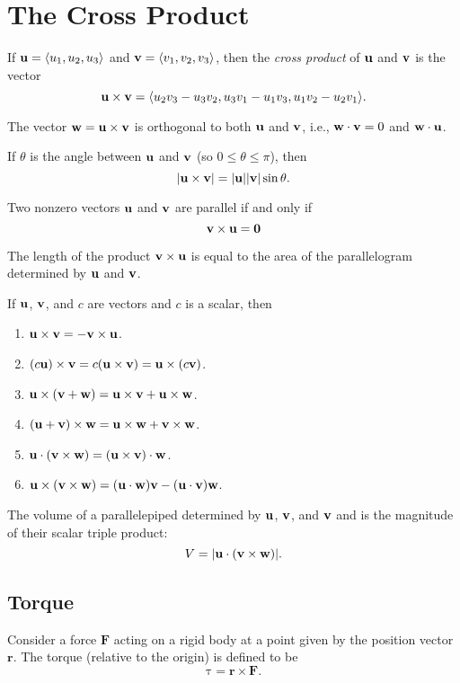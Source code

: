 \section{The Cross Product}
\begin{definition}
If $\mathbf{u}=\langle u_1,u_2,u_3\rangle$ and $\mathbf{v}=\langle v_1,v_2,v_3\rangle$,
then the \emph{cross product} of $\mathbf{u}$ and $\mathbf{v}$ is the vector
\[
\mathbf{u}\times\mathbf{v}=\langle u_2v_3-u_3v_2,u_3v_1-u_1v_3,u_1v_2-u_2v_1\rangle.
\]
\end{definition}
\begin{theorem}
The vector $\mathbf{w}=\mathbf{u}\times\mathbf{v}$ is orthogonal to both $\mathbf{u}$ and $\mathbf{v}$,
i.e., $\mathbf{w}\cdot\mathbf{v}=0$  and $\mathbf{w}\cdot\mathbf{u}$.
\end{theorem}
\begin{theorem}
If $\theta$ is the angle between $\mathbf{u}$ and $\mathbf{v}$ (so
$0\leq\theta\leq\pi$), then
\[
|\mathbf{u}\times\mathbf{v}|=|\mathbf{u}||\mathbf{v}|\sin\theta.
\]
\end{theorem}
\begin{theorem}
Two nonzero vectors $\mathbf{u}$ and $\mathbf{v}$ are parallel if and only if
\[
\mathbf{v}\times\mathbf{u}=\mathbf{0}
\]
\end{theorem}
The length of the product $\mathbf{v}\times\mathbf{u}$ is equal to the area of the
parallelogram determined by $\mathbf{u}$ and $\mathbf{v}$.
\begin{theorem}
If $\mathbf{u}$, $\mathbf{v}$, and $c$ are vectors and $c$ is a scalar, then
\begin{enumerate}[label=\textnormal{(\alph*)}]
\item $\mathbf{u}\times\mathbf{v}=-\mathbf{v}\times\mathbf{u}$.
\item $(c\mathbf{u})\times\mathbf{v}=c(\mathbf{u}\times\mathbf{v})=\mathbf{u}\times(c\mathbf{v})$.
\item $\mathbf{u}\times(\mathbf{v}+\mathbf{w})=\mathbf{u}\times\mathbf{v}+\mathbf{u}\times\mathbf{w}$.
\item $(\mathbf{u}+\mathbf{v})\times\mathbf{w}=\mathbf{u}\times\mathbf{w}+\mathbf{v}\times\mathbf{w}$.
\item $\mathbf{u}\cdot(\mathbf{v}\times\mathbf{w})=(\mathbf{u}\times\mathbf{v})\cdot\mathbf{w}$.
\item $\mathbf{u}\times(\mathbf{v}\times\mathbf{w})=(\mathbf{u}\cdot\mathbf{w})\mathbf{v}-(\mathbf{u}\cdot\mathbf{v})\mathbf{w}$.
\end{enumerate}
\end{theorem}
\bigskip
The volume of a parallelepiped determined by $\mathbf{u}$, $\mathbf{v}$, and $\mathbf{v}$ and
is the magnitude of their scalar triple product:
\begin{equation}
\label{eq:volume-of-a-parallelepiped}
V=|\mathbf{u}\cdot(\mathbf{v}\times\mathbf{w})|.
\end{equation}
\subsection{Torque}
Consider a force $\mathbf{F}$ acting on a rigid body at a point given by
the position vector $\mathbf{r}$. The torque (relative to the origin) is
defined to be
\begin{equation}
\label{eq:torque}
\bm{\mathrm{\tau}}=\mathbf{r}\times\mathbf{F}.
\end{equation}

